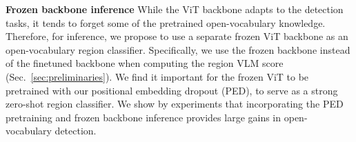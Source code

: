 \documentclass[10pt,twocolumn,letterpaper]{article}
\newcommand{\secref}[1]{Sec.~\ref{#1}}
\renewcommand{\paragraph}[1]{\vspace{1mm}\noindent\textbf{#1}}
\begin{document}
\paragraph{Frozen backbone inference}\quad
\label{sec:method:frozen}
While the ViT backbone adapts to the detection tasks, it tends to forget some of the pretrained open-vocabulary knowledge. Therefore, for inference, we propose to use a separate frozen ViT backbone as an open-vocabulary region classifier.
Specifically, we use the frozen backbone instead of the finetuned backbone when computing the region VLM score  (\secref{sec:preliminaries}). We find it important for the frozen ViT to be pretrained with our positional embedding dropout (PED), to serve as a strong zero-shot region classifier. We show by experiments that incorporating the PED pretraining and frozen backbone inference provides large gains in open-vocabulary detection.
\end{document}

